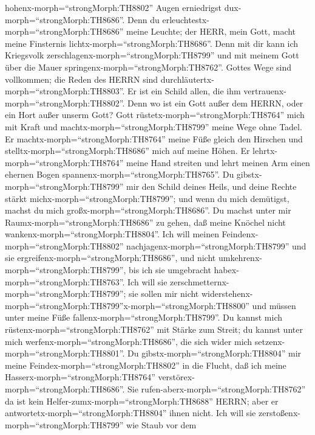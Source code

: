 hohenx-morph=``strongMorph:TH8802'' Augen erniedrigst
dux-morph=``strongMorph:TH8686''.  Denn du
erleuchtestx-morph=``strongMorph:TH8686'' meine Leuchte; der HERR, mein
Gott, macht meine Finsternis lichtx-morph=``strongMorph:TH8686''.
 Denn mit dir kann ich Kriegsvolk
zerschlagenx-morph=``strongMorph:TH8799'' und mit meinem Gott über die
Mauer springenx-morph=``strongMorph:TH8762''.  Gottes Wege
sind vollkommen; die Reden des HERRN sind
durchläutertx-morph=``strongMorph:TH8803''. Er ist ein Schild allen, die
ihm vertrauenx-morph=``strongMorph:TH8802''.  Denn wo ist
ein Gott außer dem HERRN, oder ein Hort außer unserm Gott? 
Gott rüstetx-morph=``strongMorph:TH8764'' mich mit Kraft und
machtx-morph=``strongMorph:TH8799'' meine Wege ohne Tadel. 
Er machtx-morph=``strongMorph:TH8764'' meine Füße gleich den Hirschen
und stelltx-morph=``strongMorph:TH8686'' mich auf meine Höhen.
 Er lehrtx-morph=``strongMorph:TH8764'' meine Hand streiten
und lehrt meinen Arm einen ehernen Bogen
spannenx-morph=``strongMorph:TH8765''.  Du
gibstx-morph=``strongMorph:TH8799'' mir den Schild deines Heils, und
deine Rechte stärkt michx-morph=``strongMorph:TH8799''; und wenn du mich
demütigst, machst du mich großx-morph=``strongMorph:TH8686''.
 Du machst unter mir Raumx-morph=``strongMorph:TH8686'' zu
gehen, daß meine Knöchel nicht wankenx-morph=``strongMorph:TH8804''.
 Ich will meinen Feindenx-morph=``strongMorph:TH8802''
nachjagenx-morph=``strongMorph:TH8799'' und sie
ergreifenx-morph=``strongMorph:TH8686'', und nicht
umkehrenx-morph=``strongMorph:TH8799'', bis ich sie umgebracht
habex-morph=``strongMorph:TH8763''.  Ich will sie
zerschmetternx-morph=``strongMorph:TH8799''; sie sollen mir nicht
widerstehenx-morph=``strongMorph:TH8799''x-morph=``strongMorph:TH8800''
und müssen unter meine Füße fallenx-morph=``strongMorph:TH8799''.
 Du kannst mich rüstenx-morph=``strongMorph:TH8762'' mit
Stärke zum Streit; du kannst unter mich
werfenx-morph=``strongMorph:TH8686'', die sich wider mich
setzenx-morph=``strongMorph:TH8801''.  Du
gibstx-morph=``strongMorph:TH8804'' mir meine
Feindex-morph=``strongMorph:TH8802'' in die Flucht, daß ich meine
Hasserx-morph=``strongMorph:TH8764''
verstörex-morph=``strongMorph:TH8686''.  Sie
rufen-aberx-morph=``strongMorph:TH8762'' da ist kein
Helfer-zumx-morph=``strongMorph:TH8688'' HERRN; aber er
antwortetx-morph=``strongMorph:TH8804'' ihnen nicht.  Ich
will sie zerstoßenx-morph=``strongMorph:TH8799'' wie Staub vor dem
